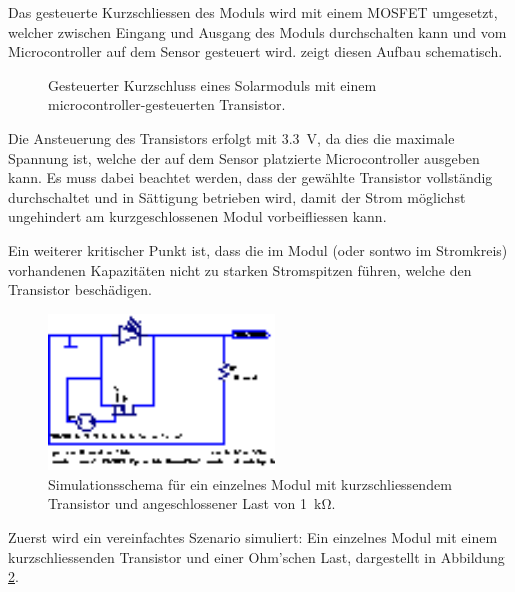 Das  gesteuerte Kurzschliessen  des Moduls  wird mit  einem MOSFET  umgesetzt,
welcher zwischen  Eingang und  Ausgang des Moduls  durchschalten kann  und vom
Microcontroller auf dem Sensor gesteuert wird. 
zeigt diesen Aufbau schematisch.

\begin{figure}
    \vspace*{-1em}
    \centering
    
    \caption{%
        Gesteuerter     Kurzschluss     eines    Solarmoduls     mit     einem
        microcontroller-gesteuerten Transistor. %
    }
    \label{fig:module:mosfet:simple}
    \vspace*{-1em}
\end{figure}

Die  Ansteuerung des  Transistors  erfolgt mit  \SI{3.3}{\volt},  da dies  die
maximale Spannung  ist, welche der  auf dem Sensor  platzierte Microcontroller
ausgeben kann. Es muss  dabei beachtet werden, dass  der gew\"ahlte Transistor
vollst\"andig durchschaltet und in S\"attigung betrieben wird, damit der Strom
m\"oglichst ungehindert am kurzgeschlossenen Modul vorbeifliessen kann.

Ein  weiterer  kritischer  Punkt  ist,  dass die  im  Modul  (oder  sontwo  im
Stromkreis) vorhandenen Kapazit\"aten nicht  zu starken Stromspitzen f\"uhren,
welche den Transistor besch\"adigen.

\begin{figure}
    \vspace*{-1em}
    \centering
    \includegraphics[width=60mm]{images/ltspice/jac/shortcircuit-transmitter.eps}
    \caption{
        Simulationsschema  f\"ur  ein  einzelnes Modul  mit  kurzschliessendem
        Transistor und angeschlossener Last von \SI{1}{\kilo\ohm}.%
    }
    \label{fig:ltspice:shortCircuit:transmitter}
    \vspace*{-4em}
\end{figure}

Zuerst wird ein vereinfachtes Szenario simuliert: Ein einzelnes Modul mit einem
kurzschliessenden Transistor und einer Ohm'schen Last, dargestellt in Abbildung
\ref{fig:ltspice:shortCircuit:transmitter}.


